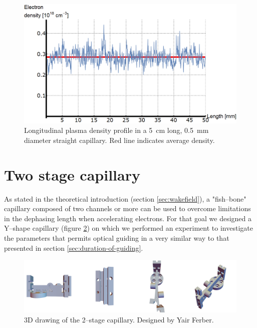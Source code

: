 \documentclass[../main.tex]{subfiles}
\begin{document}
\begin{figure}
    \centering
    \includegraphics[width=\textwidth]{figures/spectro/longitudinal_profile.png}
    \caption{Longitudinal plasma density profile in a \SI{5}{\cm} long, \SI{0.5}{\mm} diameter straight capillary. Red line indicates average density.}
    \label{fig:longi_profile}
\end{figure}


\section{Two stage capillary}
As stated in the theoretical introduction (section \ref{sec:wakefield}), a "fish--bone" capillary composed of two channels or more can be used to overcome limitations in the dephasing length when accelerating electrons. For that goal we designed a Y--shape capillary (figure \ref{fig:doublecapillaryCAD}) on which we performed an experiment to investigate the parameters that permits optical guiding in a very similar way to that presented in section \ref{sec:duration-of-guiding}.
\begin{figure}
    \centering
    \includegraphics[width=\textwidth]{figures/cad/doublecapillary_cad.png}
    \caption{3D drawing of the 2--stage capillary. Designed by Yair Ferber.}
    \label{fig:doublecapillaryCAD}
\end{figure}
\end{document}
